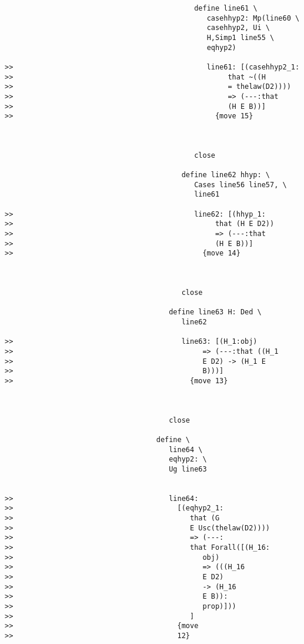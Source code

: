 \documentclass[12pt]{article}
\begin{document}
\begin{verbatim}
                                             define line61 \
                                                casehhyp2: Mp(line60 \
                                                casehhyp2, Ui \
                                                H,Simp1 line55 \
                                                eqhyp2)

>>                                              line61: [(casehhyp2_1:
>>                                                   that ~((H
>>                                                   = thelaw(D2))))
>>                                                   => (---:that
>>                                                   (H E B))]
>>                                                {move 15}



                                             close

                                          define line62 hhyp: \
                                             Cases line56 line57, \
                                             line61

>>                                           line62: [(hhyp_1:
>>                                                that (H E D2))
>>                                                => (---:that
>>                                                (H E B))]
>>                                             {move 14}



                                          close

                                       define line63 H: Ded \
                                          line62

>>                                        line63: [(H_1:obj)
>>                                             => (---:that ((H_1
>>                                             E D2) -> (H_1 E
>>                                             B)))]
>>                                          {move 13}



                                       close

                                    define \
                                       line64 \
                                       eqhyp2: \
                                       Ug line63


>>                                     line64:
>>                                       [(eqhyp2_1:
>>                                          that (G
>>                                          E Usc(thelaw(D2))))
>>                                          => (---:
>>                                          that Forall([(H_16:
>>                                             obj)
>>                                             => (((H_16
>>                                             E D2)
>>                                             -> (H_16
>>                                             E B)):
>>                                             prop)]))
>>                                          ]
>>                                       {move
>>                                       12}




\end{verbatim}
\end{document}
